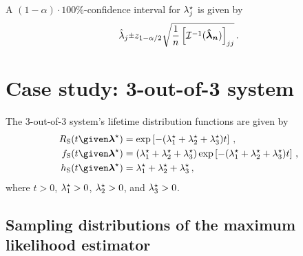 \documentclass[../main.tex]{subfiles}
\begin{document}
A $(1-\alpha) \cdot 100 \%$-confidence interval for ${\lambda}^{\star}_j$ is 
given by
\begin{equation}
\estimator\lambda_j \raisebox{.2ex}{$\scriptstyle\pm$} z_{1-\alpha/2}
    \sqrt{\frac{1}{n} \left [ \infomatrx^{-1}(\vec{\estimator{\vec\lambda}_n}) \right ]_{j j}}\,.
\end{equation}


\section{Case study: 3-out-of-3 system}
The $3$-out-of-$3$ system's lifetime distribution functions are given by
\begin{align}
    \srv_{\sv}(t \given \tparam{\vec\lambda}) &=
        \exp
        \left [
            -(\tparam{\lambda}_1 + \tparam{\lambda}_2 + \tparam{\lambda}_3) t
        \right ]\,,\\
    \spdf(t \given \tparam{\vec\lambda}) &=
        (\tparam{\lambda}_1 + \tparam{\lambda}_2 + \tparam{\lambda}_3)
        \exp
        \left [
            -(\tparam{\lambda}_1 + \tparam{\lambda}_2 + \tparam{\lambda}_3) t
        \right ]\,,\\
    \haz_{\sv}(t \given \tparam{\vec\lambda}) &= \tparam{\lambda}_1 + \tparam{\lambda}_2 + \tparam{\lambda}_3\,,
\end{align}
where $t > 0$, ${\lambda}^{\star}_1 > 0$, ${\lambda}^{\star}_2 > 0$, and ${\lambda}^{\star}_3 > 0$.

\subsection{Sampling distributions of the maximum likelihood estimator}
\end{document}

